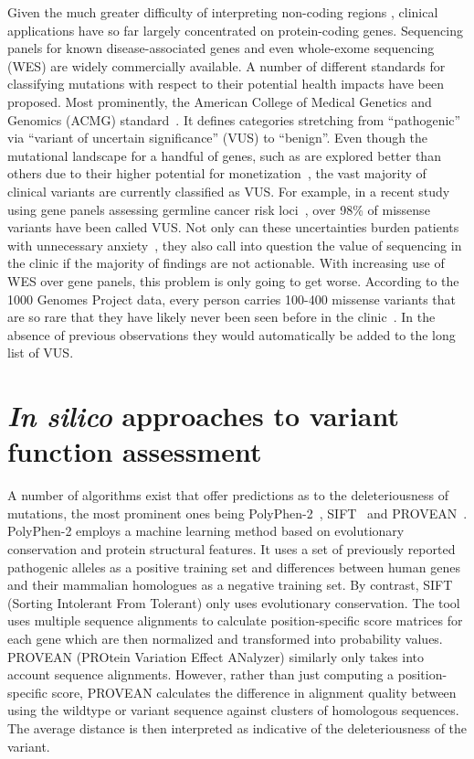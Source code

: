 Given the much greater difficulty of interpreting non-coding regions , clinical applications have so far largely concentrated on protein-coding genes. Sequencing panels for known disease-associated genes and even whole-exome sequencing (WES) are widely commercially available. A number of different standards for classifying mutations with respect to their potential health impacts have been proposed. Most prominently, the American College of Medical Genetics and Genomics (ACMG) standard~\cite{richards_standards_2015}.
It defines categories stretching from ``pathogenic'' via ``variant of uncertain significance'' (VUS) to ``benign''. Even though the mutational landscape for a handful of genes, such as  are explored better than others due to their higher potential for monetization~\cite{cheon_variants_2014}, the vast majority of clinical variants are currently classified as VUS. For example, in a recent study using gene panels assessing germline cancer risk loci~\cite{maxwell_evaluation_2016}, over 98\% of missense variants have been called VUS. Not only can these uncertainties burden patients with unnecessary anxiety~\cite{cheon_variants_2014}, they also call into question the value of sequencing in the clinic if the majority of findings are not actionable. With increasing use of WES over gene panels, this problem is only going to get worse. According to the 1000 Genomes Project data, every person carries 100-400 missense variants that are so rare that they have likely never been seen before in the clinic~\cite{the_1000_genomes_project_consortium_global_2015}. In the absence of previous observations they would automatically be added to the long list of VUS.

\section{\textit{In silico} approaches to variant function assessment}
\label{insilicoIntro}

A number of algorithms exist that offer predictions as to the deleteriousness of mutations, the most prominent ones being PolyPhen-2~\cite{adzhubei_predicting_2001}, SIFT~\cite{ng_predicting_2001} and PROVEAN~\cite{choi_predicting_2012}. PolyPhen-2 employs a machine learning method based on evolutionary conservation and protein structural features. It uses a set of previously reported pathogenic alleles as a positive training set and differences between human genes and their mammalian homologues as a negative training set. By contrast, SIFT (Sorting Intolerant From Tolerant) only uses evolutionary conservation. The tool uses multiple sequence alignments to calculate position-specific score matrices for each gene which are then normalized and transformed into probability values. PROVEAN (PROtein Variation Effect ANalyzer) similarly only takes into account sequence alignments. However, rather than just computing a position-specific score, PROVEAN calculates the difference in alignment quality between using the wildtype or variant sequence against clusters of homologous sequences. The average distance is then interpreted as indicative of the deleteriousness of the variant. 


